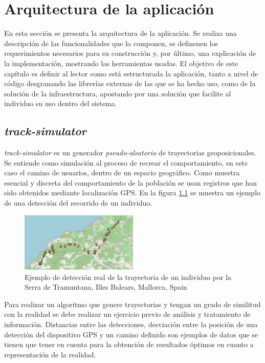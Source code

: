 \chapter{Arquitectura de la aplicación} \label{chapter:AppArchitecture}
En esta sección se presenta la arquitectura de la aplicación. Se realiza una 
descripción de las funcionalidades que lo componen, se definenen los requerimientos 
necesarios 
para su construcción y, por último, una explicación de la implementación, mostrando 
las herramientas usadas. El objetivo de este capítulo es definir al lector como está 
estructurada la aplicación, tanto a nivel de código desgranando las librerías externas de 
las que se ha hecho uso, como de la solución de la infraestructura, apostando por una 
solución que facilite al individuo su uso dentro del sistema.

\section{\textit{track-simulator}}
\textit{track-simulator} es un generador \textit{pseudo-aleatorio} de trayectorias 
geoposicionales. Se entiende como simulación al proceso de recrear el 
comportamiento, en este caso el camino de usuarios, dentro de un espacio 
geográfico. Como muestra esencial y discreta del comportamiento de la población se 
usan registros que han sido obtenidos mediante localización \ac{GPS}. En la figura 
\ref{figure:TrackExample1} se muestra un ejemplo de una detección del recorrido de un 
individuo.
\begin{figure}[!htb]
\begin{center}
\includegraphics[width=0.5\textwidth]{./Imagenes/RealTrackDetection.png}
\caption{Ejemplo de detección real de la trayectoria de un individuo por la Serra de 
Tramuntana, Illes Balears, Mallorca, Spain}
\label{figure:TrackExample1}
\end{center}
\end{figure}
\newpage

Para realizar un algoritmo que genere trayectorias y tengan un grado de similitud con la 
realidad se debe realizar un ejercicio previo de análisis y tratamiento de información. 
Distancias entre las detecciones, desviación entre la posición de una detección del 
dispositivo \ac{GPS} y un camino definido son ejemplos de datos que se tienen que 
tener en cuenta para la obtención de resultados óptimos en cuanto a representación de 
la realidad.

